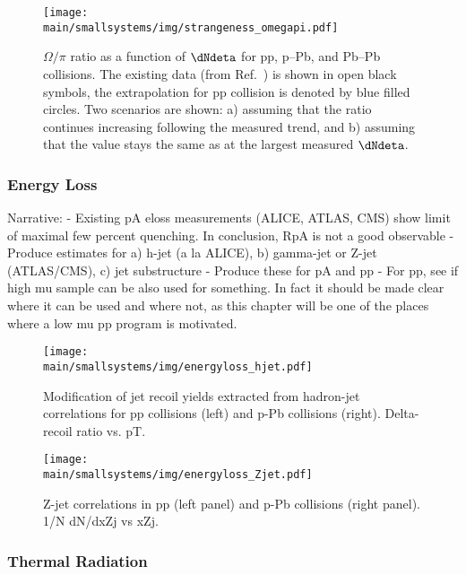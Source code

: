 \documentclass[../report.tex]{subfiles}
\providecommand{\main}{..}
\begin{document}
\begin{figure}[ht]
\centering
\texttt{[image: \\main/smallsystems/img/strangeness\_omegapi.pdf]}

\caption{$\Omega/\pi$ ratio as a function of $\dNdeta$ for pp, p--Pb, and Pb--Pb collisions. The existing data (from Ref.~\cite{ALICE:2017jyt}) is shown in open black symbols, the extrapolation for pp collision is denoted by blue filled circles. Two scenarios are shown: a) assuming that the ratio continues increasing following the measured trend, and b) assuming that the value stays the same as at the largest measured $\dNdeta$.}
\label{fig:smallsystems_strangeness_omega_pi}
\end{figure}

\subsubsection{Energy Loss}

Narrative: 
- Existing pA eloss measurements (ALICE, ATLAS, CMS) show limit of maximal few percent quenching. In conclusion, RpA is not a good observable
- Produce estimates for a) h-jet (a la ALICE), b) gamma-jet or Z-jet (ATLAS/CMS), c) jet substructure
- Produce these for pA and pp
- For pp, see if high mu sample can be also used for something. In fact it should be made clear where it can be used and where not, as this chapter will be one of the places where a low mu pp program is motivated.

\begin{figure}[ht]
\centering
\texttt{[image: \\main/smallsystems/img/energyloss\_hjet.pdf]}
\caption{Modification of jet recoil yields extracted from hadron-jet correlations for pp collisions (left) and p-Pb collisions (right). Delta-recoil ratio vs. pT.}
\label{fig:smallsystems_energyloss_hjet}
\end{figure}

\begin{figure}[ht]
\centering
\texttt{[image: \\main/smallsystems/img/energyloss\_Zjet.pdf]}

\caption{Z-jet correlations in pp (left panel) and p-Pb collisions (right panel). 1/N dN/dxZj vs xZj.}
\label{fig:smallsystems_energyloss_Zjet}
\end{figure}

\subsubsection{Thermal Radiation}
\end{document}
